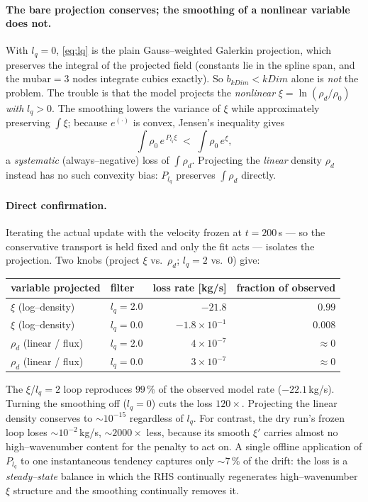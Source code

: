 \documentclass[11pt]{article}
\newcommand{\rd}{\rho_d}
\begin{document}
\paragraph{The bare projection conserves; the smoothing of a nonlinear variable
does not.} With $l_q=0$, \eqref{eq:lq} is the plain Gauss--weighted Galerkin
projection, which preserves the integral of the projected field (constants lie in
the spline span, and the $\mathrm{mubar}=3$ nodes integrate cubics exactly). So
$b_{kDim}<kDim$ alone is \emph{not} the problem. The trouble is that the model
projects the \emph{nonlinear} $\xi=\ln(\rd/\rho_0)$ \emph{with} $l_q>0$. The
smoothing lowers the variance of $\xi$ while approximately preserving $\int\xi$;
because $e^{(\cdot)}$ is convex, Jensen's inequality gives
\begin{equation}
  \int \rho_0\,e^{\,P_{l_q}\xi} \;<\; \int \rho_0\,e^{\xi},
  \label{eq:jensen}
\end{equation}
a \emph{systematic} (always--negative) loss of $\int\rd$. Projecting the
\emph{linear} density $\rd$ instead has no such convexity bias: $P_{l_q}$
preserves $\int\rd$ directly.

\paragraph{Direct confirmation.} Iterating the actual update with the velocity
frozen at $t=200$\,s --- so the conservative transport is held fixed and only the
fit acts --- isolates the projection. Two knobs (project $\xi$ vs.\ $\rd$; $l_q=2$
vs.\ $0$) give:
\begin{center}
\begin{tabular}{llrr}
\hline
variable projected & filter & loss rate [kg/s] & fraction of observed \\
\hline
$\xi$ (log--density)   & $l_q=2.0$ & $-21.8$            & $0.99$ \\
$\xi$ (log--density)   & $l_q=0.0$ & $-1.8\times10^{-1}$ & $0.008$ \\
$\rd$ (linear / flux)  & $l_q=2.0$ & $\phantom{-}4\times10^{-7}$ & $\approx 0$ \\
$\rd$ (linear / flux)  & $l_q=0.0$ & $\phantom{-}3\times10^{-7}$ & $\approx 0$ \\
\hline
\end{tabular}
\end{center}
The $\xi$/$l_q{=}2$ loop reproduces $99\,\%$ of the observed model rate
($-22.1$\,kg/s). Turning the smoothing off ($l_q=0$) cuts the loss $120\times$.
Projecting the linear density conserves to $\sim10^{-15}$ regardless of $l_q$.
For contrast, the dry run's frozen loop loses $\sim10^{-2}$\,kg/s,
$\sim2000\times$ less, because its smooth $\xi'$ carries almost no high--wavenumber
content for the penalty to act on. A single offline application of $P_{l_q}$ to one
instantaneous tendency captures only $\sim7\,\%$ of the drift: the loss is a
\emph{steady--state} balance in which the RHS continually regenerates
high--wavenumber $\xi$ structure and the smoothing continually removes it.
\end{document}
